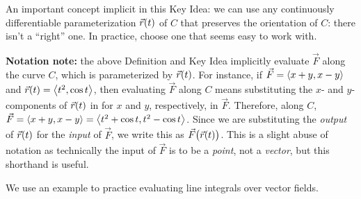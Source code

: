 An important concept implicit in this Key Idea: we can use any continuously differentiable parameterization $\vec r(t)$ of $C$ that preserves the orientation of $C$: there isn't a ``right'' one. In practice, choose one that seems easy to work with. 

\textbf{Notation note:} the above Definition and Key Idea implicitly evaluate $\vec F$ along the curve $C$, which is parameterized by $\vec r(t)$. For instance, if $\vec F =\left\langle x+y,x-y\right\rangle$ and $\vec r(t) =\left\langle t^2,\cos t\right\rangle$, then evaluating $\vec F$ along $C$ means substituting the $x$- and $y$-components of $\vec r(t)$ in for $x$ and $y$, respectively, in $\vec F$. Therefore, along $C$, $\vec F =\left\langle x+y,x-y\right\rangle=\left\langle t^2+\cos t,t^2-\cos t\right\rangle$. Since we are substituting the \emph{output} of $\vec r(t)$ for the \emph{input} of $\vec F$, we write this as $\vec F\bigl(\vec r(t)\bigr)$. This is a slight abuse of notation as technically the input of $\vec F$ is to be a \emph{point}, not a \emph{vector}, but this shorthand is useful.

We use an example to practice evaluating line integrals over vector fields.

